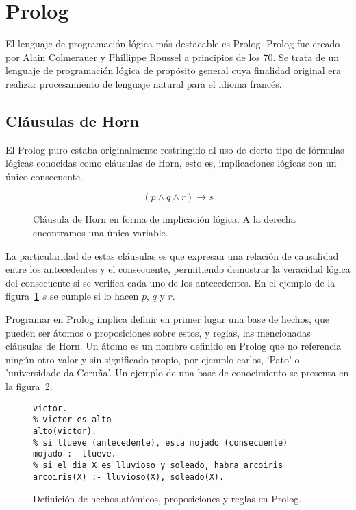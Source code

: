 \documentclass[11pt,captions=nooneline,DIV=14, parskip=full]{scrartcl}
\begin{document}
\section{Prolog}
\label{sec:prolog}

El lenguaje de programación lógica más destacable es Prolog. Prolog fue creado por Alain Colmerauer y Phillippe Roussel a principios de los 70. Se trata de un lenguaje de programación lógica de propósito general cuya finalidad original era realizar procesamiento de lenguaje natural para el idioma francés.

\subsection{Cláusulas de Horn}
\label{subsec:horn}
El Prolog puro estaba originalmente restringido al uso de cierto tipo de fórmulas lógicas conocidas como cláusulas de Horn, esto es, implicaciones lógicas con un único consecuente.

\begin{figure}[h]
\label{fig:horn}
{\Large{\[ ( p \land q \land r ) \to s \]}}%
\caption{Cláusula de Horn en forma de implicación lógica. A la derecha encontramos una única variable.}
\end{figure}

La particularidad de estas cláusulas es que expresan una relación de causalidad entre los antecedentes y el consecuente, permitiendo demostrar la veracidad lógica del consecuente si se verifica cada uno de los antecedentes. En el ejemplo de la figura~\ref{fig:horn} $ s $ se cumple si lo hacen $ p $, $ q $ y $r $.

Programar en Prolog implica definir en primer lugar una base de hechos, que pueden ser átomos o proposiciones sobre estos, y reglas, las mencionadas cláusulas de Horn. Un átomo es un nombre definido en Prolog que no referencia ningún otro valor y sin significado propio, por ejemplo carlos, 'Pato' o 'universidade da Coruña'. Un ejemplo de una base de conocimiento se presenta en la figura~\ref{fig:knowledge}.

\begin{figure}[h]
\label{fig:knowledge}
\lstset{language=Prolog}
\begin{lstlisting}[frame=single]
% atomo victor: victor existe
victor.
% victor es alto
alto(victor).
% si llueve (antecedente), esta mojado (consecuente)
mojado :- llueve.
% si el dia X es lluvioso y soleado, habra arcoiris
arcoiris(X) :- lluvioso(X), soleado(X).	
\end{lstlisting} 
\caption{Definición de hechos atómicos, proposiciones y reglas en Prolog.}
\end{figure}
\end{document}
